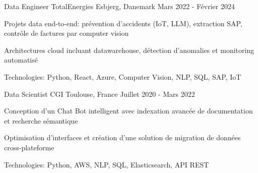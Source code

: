 \begin{cventries}

\cventry
{Data Engineer} %
{TotalEnergies} %
{Esbjerg, Danemark} %
{Mars 2022 - Février 2024} %
{ %
\begin{cvitems}
\item {Projets data end-to-end: prévention d'accidents (IoT, LLM), extraction SAP, contrôle de factures par computer vision}
\item {Architectures cloud incluant datawarehouse, détection d'anomalies et monitoring automatisé}
\item {Technologies: Python, React, Azure, Computer Vision, NLP, SQL, SAP, IoT}
\end{cvitems}
}
\vspace{1.5em}


\cventry
{Data Scientist} %
{CGI} %
{Toulouse, France} %
{Juillet 2020 - Mars 2022} %
{ %
\begin{cvitems}
\item {Conception d'un Chat Bot intelligent avec indexation avancée de documentation et recherche sémantique}
\item {Optimisation d'interfaces et création d'une solution de migration de données cross-plateforme}
\item {Technologies: Python, AWS, NLP, SQL, Elasticsearch, API REST}
\end{cvitems}
}
\vspace{1.5em}


\end{cventries}